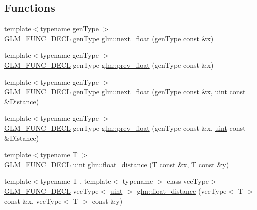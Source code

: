 \subsection*{Functions}
\begin{DoxyCompactItemize}
\item 
{\footnotesize template$<$typename gen\+Type $>$ }\\\hyperlink{setup_8hpp_ab2d052de21a70539923e9bcbf6e83a51}{G\+L\+M\+\_\+\+F\+U\+N\+C\+\_\+\+D\+E\+CL} gen\+Type \hyperlink{group__gtc__ulp_gae516ae554faa6117660828240e8bdaf0}{glm\+::next\+\_\+float} (gen\+Type const \&x)
\item 
{\footnotesize template$<$typename gen\+Type $>$ }\\\hyperlink{setup_8hpp_ab2d052de21a70539923e9bcbf6e83a51}{G\+L\+M\+\_\+\+F\+U\+N\+C\+\_\+\+D\+E\+CL} gen\+Type \hyperlink{group__gtc__ulp_ga2fcbb7bfbfc595712bfddc51b0715b07}{glm\+::prev\+\_\+float} (gen\+Type const \&x)
\item 
{\footnotesize template$<$typename gen\+Type $>$ }\\\hyperlink{setup_8hpp_ab2d052de21a70539923e9bcbf6e83a51}{G\+L\+M\+\_\+\+F\+U\+N\+C\+\_\+\+D\+E\+CL} gen\+Type \hyperlink{group__gtc__ulp_gad107ec3d9697ef82032a33338a73ebdd}{glm\+::next\+\_\+float} (gen\+Type const \&x, \hyperlink{group__core__precision_ga4fd29415871152bfb5abd588334147c8}{uint} const \&Distance)
\item 
{\footnotesize template$<$typename gen\+Type $>$ }\\\hyperlink{setup_8hpp_ab2d052de21a70539923e9bcbf6e83a51}{G\+L\+M\+\_\+\+F\+U\+N\+C\+\_\+\+D\+E\+CL} gen\+Type \hyperlink{group__gtc__ulp_gaa399d5b6472a70e8952f9b26ecaacdec}{glm\+::prev\+\_\+float} (gen\+Type const \&x, \hyperlink{group__core__precision_ga4fd29415871152bfb5abd588334147c8}{uint} const \&Distance)
\item 
{\footnotesize template$<$typename T $>$ }\\\hyperlink{setup_8hpp_ab2d052de21a70539923e9bcbf6e83a51}{G\+L\+M\+\_\+\+F\+U\+N\+C\+\_\+\+D\+E\+CL} \hyperlink{group__core__precision_ga4fd29415871152bfb5abd588334147c8}{uint} \hyperlink{group__gtc__ulp_ga2e09bd6c8b0a9c91f6f5683d68245634}{glm\+::float\+\_\+distance} (T const \&x, T const \&y)
\item 
{\footnotesize template$<$typename T , template$<$ typename $>$ class vec\+Type$>$ }\\\hyperlink{setup_8hpp_ab2d052de21a70539923e9bcbf6e83a51}{G\+L\+M\+\_\+\+F\+U\+N\+C\+\_\+\+D\+E\+CL} vec\+Type$<$ \hyperlink{group__core__precision_ga4fd29415871152bfb5abd588334147c8}{uint} $>$ \hyperlink{group__gtc__ulp_ga85355f2549d75789eb66e5d565d8ad26}{glm\+::float\+\_\+distance} (vec\+Type$<$ T $>$ const \&x, vec\+Type$<$ T $>$ const \&y)
\end{DoxyCompactItemize}


